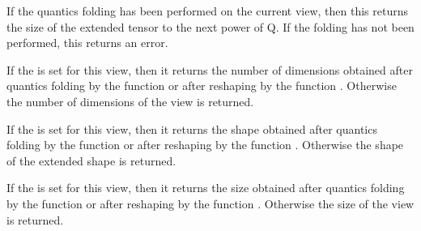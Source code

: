 \documentclass[a4paper,10pt,english]{sphinxmanual}
\begin{document}
\begin{fulllineitems}
\begin{fulllineitems}
\end{fulllineitems}


\begin{fulllineitems}
\label{api-tw:TensorToolbox.core.TensorWrapper.get_extended_size}
If the quantics folding has been performed on the current view, then this returns the size of the extended tensor to the next power of Q. If the folding has not been performed, this returns an error.

\end{fulllineitems}


\begin{fulllineitems}
\label{api-tw:TensorToolbox.core.TensorWrapper.get_ghost_ndim}
If the  is set for this view, then it returns the number of dimensions obtained after quantics folding by the function  or after reshaping by the function . Otherwise the number of dimensions of the view is returned.

\end{fulllineitems}


\begin{fulllineitems}
\label{api-tw:TensorToolbox.core.TensorWrapper.get_ghost_shape}
If the  is set for this view, then it returns the shape obtained after quantics folding by the function  or after reshaping by the function . Otherwise the shape of the extended shape is returned.

\end{fulllineitems}


\begin{fulllineitems}
\label{api-tw:TensorToolbox.core.TensorWrapper.get_ghost_size}
If the  is set for this view, then it returns the size obtained after quantics folding by the function  or after reshaping by the function . Otherwise the size of the view is returned.


\end{fulllineitems}
\end{fulllineitems}
\end{document}
